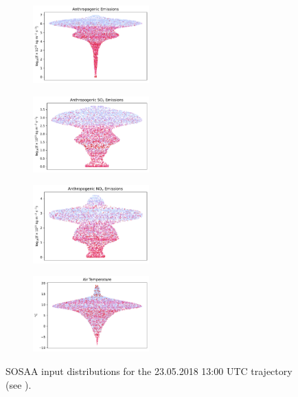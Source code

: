 \begin{figure}[H]
    \begin{subfigure}
        \centering
        \includegraphics[width=0.49\textwidth,valign=t]{sosaa-data/figures/trajectories/trajectory-23.05.2018:13.00-anthropogenic.pdf}
    \end{subfigure}
    \begin{subfigure}
        \centering
        \includegraphics[width=0.49\textwidth,valign=t]{sosaa-data/figures/trajectories/trajectory-23.05.2018:13.00-so2.pdf}
    \end{subfigure}

    \begin{subfigure}
        \centering
        \includegraphics[width=0.49\textwidth,valign=t]{sosaa-data/figures/trajectories/trajectory-23.05.2018:13.00-nox.pdf}
    \end{subfigure}
    \begin{subfigure}
        \centering
        \includegraphics[width=0.49\textwidth,valign=t]{sosaa-data/figures/trajectories/trajectory-23.05.2018:13.00-temperature.pdf}
    \end{subfigure}

    \caption[Inputs for the 23.05.2018 13:00 UTC Trajectory]{SOSAA input distributions for the 23.05.2018 13:00 UTC trajectory (see ).}
    \label{fig:trajectory-inputs-23-05}
\end{figure}
